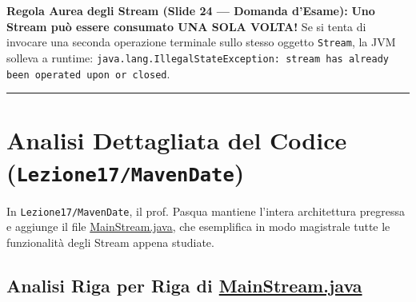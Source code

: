 \documentclass[11pt,a4paper,oneside]{report}
\newcommand{\passthrough}[1]{#1}
\begin{document}
\begin{studywarning} \textbf{Regola Aurea degli Stream (Slide 24 --- Domanda
d'Esame):} \textbf{Uno Stream può essere consumato UNA SOLA VOLTA!} Se
si tenta di invocare una seconda operazione terminale sullo stesso
oggetto \passthrough{\lstinline!Stream!}, la JVM solleva a runtime:
\passthrough{\lstinline!java.lang.IllegalStateException: stream has already been operated upon or closed!}.
\end{studywarning}

\begin{center}\rule{0.5\linewidth}{0.5pt}\end{center}

\section{\texorpdfstring{Analisi Dettagliata del Codice
(\texttt{Lezione17/MavenDate})}{Analisi Dettagliata del Codice (Lezione17/MavenDate)}}\label{chap17_analisi-dettagliata-del-codice-lezione17mavendate}

In \passthrough{\lstinline!Lezione17/MavenDate!}, il prof. Pasqua
mantiene l'intera architettura pregressa e aggiunge il file
\href{file:///home/wally/Documenti/GitHub/Programmazione-II/25-26/Teoria-e-Esercitazioni/Codice-20260902/Lezione17/MavenDate/src/main/java/it/oop/ui/MainStream.java}{MainStream.java},
che esemplifica in modo magistrale tutte le funzionalità degli Stream
appena studiate.

\subsection{\texorpdfstring{Analisi Riga per Riga di
\href{file:///home/wally/Documenti/GitHub/Programmazione-II/25-26/Teoria-e-Esercitazioni/Codice-20260902/Lezione17/MavenDate/src/main/java/it/oop/ui/MainStream.java}{MainStream.java}}{Analisi Riga per Riga di MainStream.java}}\label{chap17_analisi-riga-per-riga-di-mainstream.java}
\end{document}
